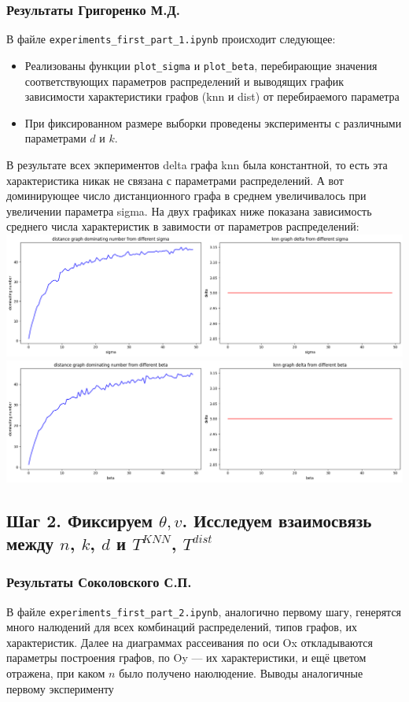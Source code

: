 \documentclass[a4paper,12pt]{article}
\begin{document}
\subsubsection*{Результаты Григоренко М.Д.}
В файле \texttt{experiments\_first\_part\_1.ipynb} происходит следующее:
\begin{itemize}
    \item Реализованы функции \texttt{plot\_sigma} и \texttt{plot\_beta}, перебирающие значения соответствующих параметров распределений и выводящих график зависимости характеристики графов (knn и dist) от перебираемого параметра
    \item При фиксированном размере выборки проведены эксперименты с различными параметрами $d$ и $k$.
\end{itemize}
В результате всех экпериментов delta графа knn была константной, то есть
эта характеристика никак не связана с параметрами распределений. А вот доминирующее число дистанционного графа в среднем увеличивалось при увеличении параметра sigma. На двух графиках ниже показана зависимость среднего числа характеристик в завимости от параметров распределений: \newline
\includegraphics[width=\textwidth]{images/sigma_plot.png} \newline
\includegraphics[width=\textwidth]{images/beta_plot.png} \newline

\subsection{Шаг 2. Фиксируем $\theta, v$. Исследуем взаимосвязь между $n$, $k$, $d$ и $T^{KNN}$, $T^{dist}$}
\subsubsection*{Результаты Соколовского С.П.}
В файле \texttt{experiments\_first\_part\_2.ipynb}, аналогично первому шагу, генерятся много налюдений для всех комбинаций распределений, типов графов, их характеристик. Далее на диаграммах рассеивания по оси Ox откладываются параметры построения графов, по Oy --- их характеристики, и ещё цветом отражена, при каком $n$ было получено наюлюдение. Выводы аналогичные первому эксперименту
\end{document}
